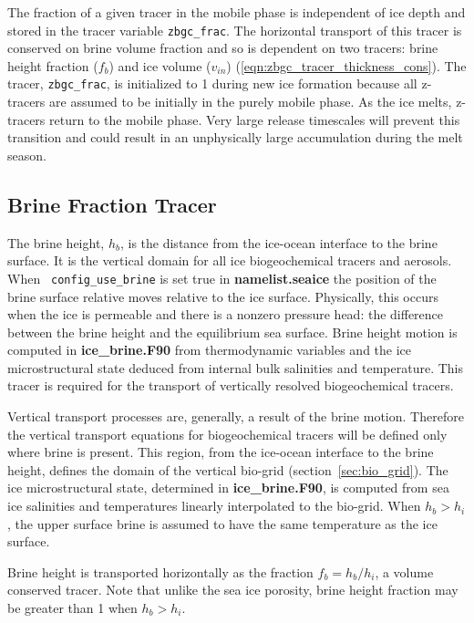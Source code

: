 The fraction of a given tracer in the mobile phase is independent of
ice depth and stored in the
tracer variable  {\tt zbgc\_frac}. The horizontal transport of this
tracer is conserved on brine volume fraction and so is dependent on two
tracers: brine height fraction ($f_b$) and ice volume ($v_{in}$) (\ref{eqn:zbgc_tracer_thickness_cons}).  The tracer, {\tt zbgc\_frac}, is initialized to 1 during new ice formation because
 all z-tracers are assumed to be initially in the purely mobile phase.
As the ice melts, z-tracers return to the mobile phase.
Very large release timescales will prevent this transition and could
result in an unphysically large accumulation during the melt season.

\subsection{Brine Fraction Tracer}
\label{sec:brine}
The brine height, $h_b$, is the distance from the
ice-ocean interface to the brine surface. It is the vertical domain
for all ice biogeochemical tracers and aerosols.   When {\tt
  config\_use\_brine} is set true in {\bf namelist.seaice} the position
of the  brine
surface  relative moves relative to the
 ice surface. Physically, this occurs when the ice is permeable and there is
a nonzero pressure head: the difference between the brine
height and the equilibrium sea surface. Brine height motion is
computed in {\bf ice\_brine.F90} from thermodynamic variables and the ice microstructural state
deduced from internal bulk salinities and temperature.  This tracer
is required for the transport of vertically resolved biogeochemical
tracers.

Vertical transport
processes are, generally, a result of the brine motion. Therefore the vertical
transport equations for biogeochemical tracers will be defined only
where brine is present.  This region, from the ice-ocean interface to
the brine height, defines the domain of the vertical bio-grid (section~\ref{sec:bio_grid}). The ice
microstructural state, determined in {\bf ice\_brine.F90}, is computed
from sea ice salinities and temperatures linearly interpolated to the
bio-grid.  When $h_b > h_i$, the upper surface brine is assumed to
have the same temperature as the ice surface.

Brine height is  transported horizontally as the
fraction $f_{b} = h_b/h_i$, a volume conserved
tracer.  Note
that unlike the sea ice porosity, brine height fraction may be greater than 1
when $h_b > h_i$.

